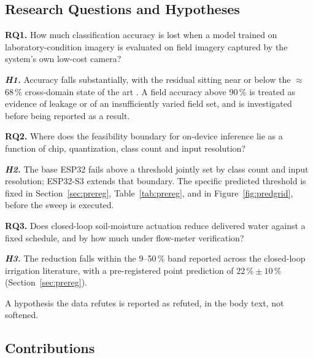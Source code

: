 \documentclass[journal]{IEEEtran}
\begin{document}
\subsection{Research Questions and Hypotheses}
\label{sec:rqs}

\textbf{RQ1.} How much classification accuracy is lost when a model trained
on laboratory-condition imagery is evaluated on field imagery captured by
the system's own low-cost camera?

\emph{\textbf{H1.}} Accuracy falls substantially, with the residual sitting
near or below the $\approx$68\,\% cross-domain state of the art
\cite{salman2025plantdisease}. A field accuracy above 90\,\% is treated as
evidence of leakage or of an insufficiently varied field set, and is
investigated before being reported as a result.

\textbf{RQ2.} Where does the feasibility boundary for on-device inference
lie as a function of chip, quantization, class count and input resolution?

\emph{\textbf{H2.}} The base ESP32 fails above a threshold jointly set by
class count and input resolution; ESP32-S3 extends that boundary. The
specific predicted threshold is fixed in
Section~\ref{sec:prereg}, Table~\ref{tab:prereg}, and in
Figure~\ref{fig:predgrid}, before the sweep is executed.

\textbf{RQ3.} Does closed-loop soil-moisture actuation reduce delivered
water against a fixed schedule, and by how much under flow-meter
verification?

\emph{\textbf{H3.}} The reduction falls within the 9--50\,\% band reported
across the closed-loop irrigation literature, with a pre-registered point
prediction of $22\,\%\pm10\,\%$ (Section~\ref{sec:prereg}).

A hypothesis the data refutes is reported as refuted, in the body text,
not softened.

\subsection{Contributions}
\end{document}
